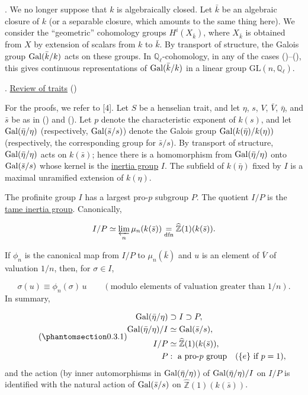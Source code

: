 . We no longer suppose that $k$ is algebraically closed. Let $\bar{k}$ be an algebraic closure of $k$ (or a separable closure, which amounts to the same thing here). We consider the ``geometric'' cohomology groups $H^i(X_{\bar{k}})$, where $X_{\bar{k}}$ is obtained from $X$ by extension of scalars from $k$ to $\bar{k}$. By transport of structure, the Galois group $\operatorname{Gal}(\bar{k}/k)$ acts on these groups. In $\mathbb{Q}_\ell$-cohomology, in any of the cases ()--(), this gives continuous representations of $\operatorname{Gal}(\bar{k}/k)$ in a linear group $\mathrm{GL}(n,\mathbb{Q}_\ell)$.

. \underline{Review of traits} ()

For the proofs, we refer to [4]. Let $S$ be a henselian trait, and let $\eta$, $s$, $V$, $\bar V$, $\bar\eta$, and $\bar s$ be as in () and (). Let $p$ denote the characteristic exponent of $k(s)$, and let $\operatorname{Gal}(\bar\eta/\eta)$ (respectively, $\operatorname{Gal}(\bar s/s)$) denote the Galois group $\operatorname{Gal}(k(\bar\eta)/k(\eta))$ (respectively, the corresponding group for $\bar s/s$). By transport of structure, $\operatorname{Gal}(\bar\eta/\eta)$ acts on $k(\bar s)$; hence there is a homomorphism from $\operatorname{Gal}(\bar\eta/\eta)$ onto $\operatorname{Gal}(\bar s/s)$ whose kernel is the \underline{inertia group} $I$. The subfield of $k(\bar\eta)$ fixed by $I$ is a maximal unramified extension of $k(\eta)$.

The profinite group $I$ has a largest pro-$p$ subgroup $P$. The quotient $I/P$ is the \underline{tame inertia group}. Canonically,

\begin{equation*}
I/P\simeq \varprojlim_n\mu_n(k(\bar s))
\underset{\mathrm{dfn}}{=}\widehat{\mathbb{Z}}(1)(k(\bar s)).
\end{equation*}


If $\phi_n$ is the canonical map from $I/P$ to $\mu_n(\bar k)$ and $u$ is an element of $\bar V$ of valuation $1/n$, then, for $\sigma\in I$,

\begin{equation*}
\sigma(u)\equiv\phi_n(\sigma)\,u
\qquad (\text{modulo elements of valuation greater than }1/n).
\end{equation*}
In summary,

\begin{equation}\tag{\SGARefTarget{sga7.sga7i.ei.n0-3-1}{0.3.1}}
\begin{aligned}
\Gal(\bar\eta/\eta)&\supset I\supset P,\\
\Gal(\bar\eta/\eta)/I&\simeq\Gal(\bar s/s),\\
I/P&\simeq\widehat{\mathbb{Z}}(1)(k(\bar s)),\\
P&:\ \text{a pro-$p$ group}\quad(\{e\}\text{ if }p=1),
\end{aligned}
\end{equation}
and the action (by inner automorphisms in $\operatorname{Gal}(\bar\eta/\eta)$) of $\operatorname{Gal}(\bar\eta/\eta)/I$ on $I/P$ is identified with the natural action of $\operatorname{Gal}(\bar s/s)$ on $\widehat{\mathbb{Z}}(1)(k(\bar s))$.

